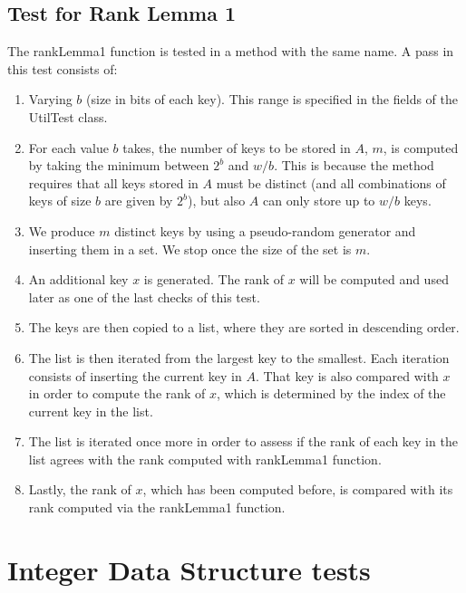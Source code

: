 \subsection{Test for Rank Lemma 1}
The {\ttfamily rankLemma1} function is tested in a method with the same name.
A pass in this test consists of:
\begin{enumerate}
    \item
    Varying $b$ (size in bits of each key). This range is specified in the fields of the {\ttfamily UtilTest} class.
    
    \item
    For each value $b$ takes, the number of keys to be stored in $A$, $m$, is computed by taking the minimum between $2^b$ and $w/b$. This is because the method requires that all keys stored in $A$ must be distinct (and all combinations of keys of size $b$ are given by $2^b$), but also $A$ can only store up to $w/b$ keys.
    
    \item
    We produce $m$ distinct keys by using a pseudo-random generator and inserting them in a set. We stop once the size of the set is $m$.
    
    \item
    An additional key $x$ is generated. The rank of $x$ will be computed and used later as one of the last checks of this test.
    
    \item
    The keys are then copied to a list, where they are sorted in descending order.
    
    \item
    The list is then iterated from the largest key to the smallest. Each iteration consists of inserting the current key in $A$. That key is also compared with $x$ in order to compute the rank of $x$, which is determined by the index of the current key in the list.
    
    \item
    The list is iterated once more in order to assess if the rank of each key in the list agrees with the rank computed with {\ttfamily rankLemma1} function.
    
    \item
    Lastly, the rank of $x$, which has been computed before, is compared with its rank computed via the {\ttfamily rankLemma1} function.
\end{enumerate}

\section{Integer Data Structure tests}

